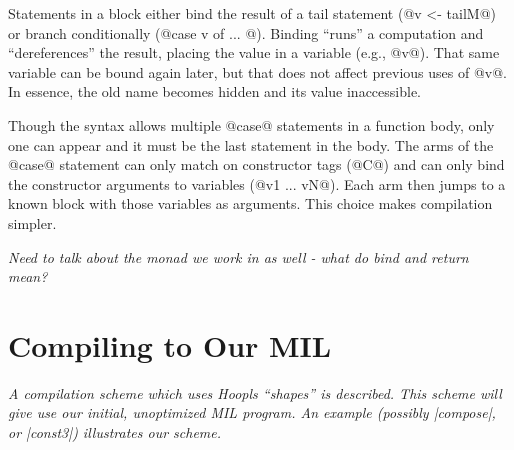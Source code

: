 \documentclass[12pt]{report}
\begin{document}

Statements in a block either bind the result of a tail statement 
(@v <- tailM@) or branch conditionally (@case v of ... @). Binding ``runs''
a computation and ``dereferences'' the result, placing
the value in a variable (e.g., @v@). That same variable can be bound
again later, but that does not affect previous uses of @v@. In essence, the old
name becomes hidden and its value inaccessible.

Though the syntax allows multiple @case@ statements in a function
body, only one can appear and it must be the last statement in the
body. The arms of the @case@ statement can only match on constructor
tags (@C@) and can only bind the constructor arguments to variables
(@v1 ... vN@). Each arm then jumps to a known block with those
variables as arguments. This choice makes compilation simpler.



\emph{Need to talk about the monad we work in as well - what 
do bind and return mean?}

\section{Compiling to Our MIL}
\emph{A compilation scheme which uses Hoopls ``shapes'' is
described. This scheme will give use our initial, unoptimized
MIL program. An example (possibly |compose|, or |const3|) illustrates 
our scheme.}
\end{document}
